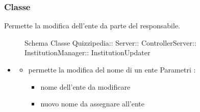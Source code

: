 \subsubsection{Classe }
Permette la modifica dell'ente da parte del responsabile.
\begin{figure}[H]
\centering
\noindent{}
\caption[Schema Classe InstitutionUpdater]{Schema Classe Quizzipedia:: Server:: ControllerServer:: InstitutionManager:: InstitutionUpdater}
\end{figure}
\begin{itemize}
\item {}
\begin{itemize}
\item {}
\newline
permette la modifica del nome di un ente
\newline
Parametri :
\begin{itemize}
\item {}
\newline
nome dell'ente da modificare
\item {}
\newline
nuovo nome da assegnare all'ente
\end{itemize}
\end{itemize}
\end{itemize}
